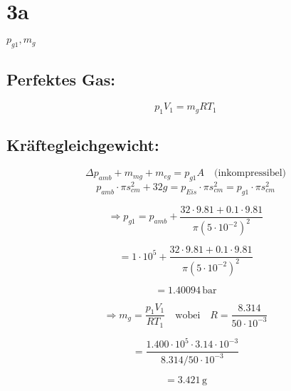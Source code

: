 

\section*{3a}

$p_{g1}, m_g$

\subsection*{Perfektes Gas:}
\[
p_1 V_1 = m_g R T_1
\]

\subsection*{Kräftegleichgewicht:}
\[
\Delta p_{amb} + m_{mg} + m_{eg} = p_{g1} A \quad \text{(inkompressibel)}
\]
\[
p_{amb} \cdot \pi s_{cm}^2 + 32 g = p_{Eis} \cdot \pi s_{cm}^2 = p_{g1} \cdot \pi s_{cm}^2
\]

\[
\Rightarrow p_{g1} = p_{amb} + \frac{32 \cdot 9.81 + 0.1 \cdot 9.81}{\pi (5 \cdot 10^{-2})^2}
\]

\[
= 1 \cdot 10^5 + \frac{32 \cdot 9.81 + 0.1 \cdot 9.81}{\pi (5 \cdot 10^{-2})^2}
\]

\[
= 1.40094 \, \text{bar}
\]

\[
\Rightarrow m_g = \frac{p_1 V_1}{R T_1} \quad \text{wobei} \quad R = \frac{8.314}{50 \cdot 10^{-3}}
\]

\[
= \frac{1.400 \cdot 10^5 \cdot 3.14 \cdot 10^{-3}}{8.314 / 50 \cdot 10^{-3}}
\]

\[
= 3.421 \, \text{g}
\]
